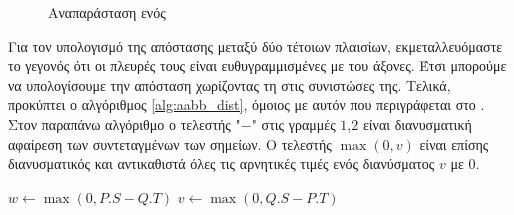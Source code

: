 \begin{figure}[h]
    \centering
    
    \newcommand{\Depth}{2}
    \newcommand{\Height}{2}
    \newcommand{\Width}{3}
    \caption[Αναπαράσταση ενός ]{Αναπαράσταση ενός }
\end{figure}


Για τον υπολογισμό της απόστασης μεταξύ δύο τέτοιων πλαισίων, 
εκμεταλλευόμαστε το γεγονός ότι οι πλευρές τους είναι ευθυγραμμισμένες
με του άξονες.
Έτσι μπορούμε να υπολογίσουμε την απόσταση χωρίζοντας τη στις συνιστώσες της.
Τελικά, προκύπτει ο αλγόριθμος \ref{alg:aabb_dist}, 
όμοιος με αυτόν που περιγράφεται στο \cite{krishnamurthy2011gpu}.
Στον παραπάνω αλγόριθμο  ο τελεστής "$-$" στις γραμμές 
$1$,$2$ είναι διανυσματική αφαίρεση των συντεταγμένων των σημείων.
Ο τελεστής $\max(0, v)$ είναι επίσης διανυσματικός και
αντικαθιστά όλες τις αρνητικές τιμές ενός διανύσματος $v$
με $0$.

\IncMargin{1.5em}
\begin{algorithm}[h]
\DontPrintSemicolon
{}

    $w \gets \max(0, P.S - Q.T)$\;
    $v \gets \max(0, Q.S - P.T)$\;

\caption[Υπολογισμός Απόστασης δύο ]{
}
\label{alg:aabb_dist}
\end{algorithm}
\DecMargin{1.5em}




